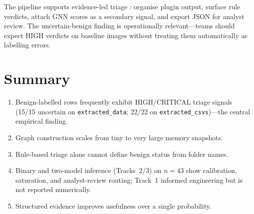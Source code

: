 The pipeline supports evidence-led triage \cite{case2017memory}: organise plugin output, surface rule verdicts, attach GNN scores as a secondary signal, and export JSON for analyst review. The uncertain-benign finding is operationally relevant---teams should expect HIGH verdicts on baseline images without treating them automatically as labelling errors.

\section{Summary}

\begin{enumerate}
\item Benign-labelled rows frequently exhibit HIGH/CRITICAL triage signals (15/15 uncertain on \texttt{extracted\_data}; 22/22 on \texttt{extracted\_csvs})---the central empirical finding.
\item Graph construction scales from tiny to very large memory snapshots.
\item Rule-based triage alone cannot define benign status from folder names.
\item Binary and two-model inference (Tracks~2/3) on $n{=}43$ show calibration, saturation, and analyst-review routing; Track~1 informed engineering but is not reported numerically.
\item Structured evidence improves usefulness over a single probability.
\end{enumerate}
